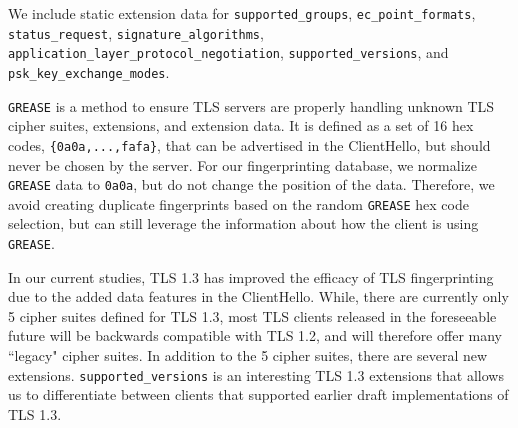 \documentclass{book}
\begin{document}
We include static extension data for \texttt{supported\_groups}, \texttt{ec\_point\_formats}, \texttt{status\_request}, \texttt{signature\_algorithms}, \texttt{application\_layer\_protocol\_negotiation}, \texttt{supported\_versions}, and \texttt{psk\_key\_exchange\_modes}.

\texttt{GREASE} \cite{grease} is a method to ensure TLS servers are properly handling unknown TLS cipher suites, extensions, and extension data. It is defined as a set of 16 hex codes, \texttt{\{0a0a,...,fafa\}}, that can be advertised in the ClientHello, but should never be chosen by the server. For our fingerprinting database, we normalize \texttt{GREASE} data to \texttt{0a0a}, but do not change the position of the data. Therefore, we avoid creating duplicate fingerprints based on the random \texttt{GREASE} hex code selection, but can still leverage the information about how the client is using \texttt{GREASE}. 

In our current studies, TLS 1.3 has improved the efficacy of TLS fingerprinting due to the added data features in the ClientHello. While, there are currently only 5 cipher suites defined for TLS 1.3, most TLS clients released in the foreseeable future will be backwards compatible with TLS 1.2, and will therefore offer many ``legacy" cipher suites. In addition to the 5 cipher suites, there are several new extensions. \texttt{supported\_versions} is an interesting TLS 1.3 extensions that allows us to differentiate between clients that supported earlier draft implementations of TLS 1.3.
\end{document}
